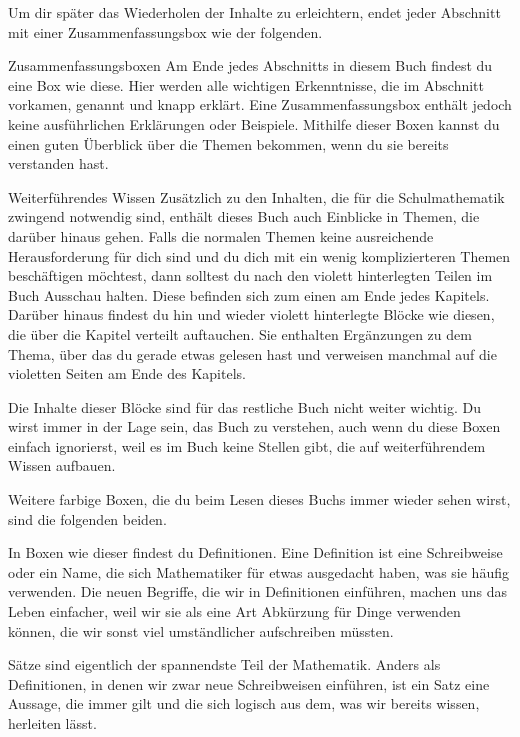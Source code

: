 \documentclass[../main.tex]{subfiles}
\begin{document}
Um dir später das Wiederholen der Inhalte zu erleichtern, endet jeder Abschnitt mit einer Zusammenfassungsbox wie der folgenden.

\begin{nutshell}{Zusammenfassungsboxen}
    Am Ende jedes Abschnitts in diesem Buch findest du eine Box wie diese. Hier werden alle wichtigen Erkenntnisse, die im Abschnitt vorkamen, genannt und knapp erklärt. Eine Zusammenfassungsbox enthält jedoch keine ausführlichen Erklärungen oder Beispiele. Mithilfe dieser Boxen kannst du einen guten Überblick über die Themen bekommen, wenn du sie bereits verstanden hast.
\end{nutshell}

\begin{advanced}{Weiterführendes Wissen}
    Zusätzlich zu den Inhalten, die für die Schulmathematik zwingend notwendig sind, enthält dieses Buch auch Einblicke in Themen, die darüber hinaus gehen. Falls die normalen Themen keine ausreichende Herausforderung für dich sind und du dich mit ein wenig komplizierteren Themen beschäftigen möchtest, dann solltest du nach den violett hinterlegten Teilen im Buch Ausschau halten. Diese befinden sich zum einen am Ende jedes Kapitels. Darüber hinaus findest du hin und wieder violett hinterlegte Blöcke wie diesen, die über die Kapitel verteilt auftauchen. Sie enthalten Ergänzungen zu dem Thema, über das du gerade etwas gelesen hast und verweisen manchmal auf die violetten Seiten am Ende des Kapitels.

    Die Inhalte dieser Blöcke sind für das restliche Buch nicht weiter wichtig. Du wirst immer in der Lage sein, das Buch zu verstehen, auch wenn du diese Boxen einfach ignorierst, weil es im Buch keine Stellen gibt, die auf weiterführendem Wissen aufbauen.
\end{advanced}

Weitere farbige Boxen, die du beim Lesen dieses Buchs immer wieder sehen wirst, sind die folgenden beiden.

\begin{definition}{}
    In Boxen wie dieser findest du Definitionen. Eine Definition ist eine Schreibweise oder ein Name, die sich Mathematiker für etwas ausgedacht haben, was sie häufig verwenden. Die neuen Begriffe, die wir in Definitionen einführen, machen uns das Leben einfacher, weil wir sie als eine Art Abkürzung für Dinge verwenden können, die wir sonst viel umständlicher aufschreiben müssten.
\end{definition}

\begin{theorem}{}
    Sätze sind eigentlich der spannendste Teil der Mathematik. Anders als Definitionen, in denen wir zwar neue Schreibweisen einführen, ist ein Satz eine Aussage, die immer gilt und die sich logisch aus dem, was wir bereits wissen, herleiten lässt.
\end{theorem}
\end{document}
